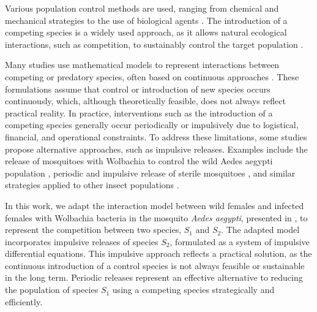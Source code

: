 \documentclass[10pt,letterpaper]{article}
\begin{document}
Various population control methods are used, ranging from chemical \cite{brunner1994integratedChemical1,carson2023overcomingI3,gautam2023pesticideChemical2,lees2023insecticidesI1} and mechanical \cite{adhikari2022insectMechanical1,vincent2009physicalM2} strategies to the use of biological agents \cite{brunner1994integratedChemical1,barbosa2018modellingI2, campo2018optimalW9,onen2023mosquito}. The introduction of a competing species is a widely used approach, as it allows natural ecological interactions, such as competition, to sustainably control the target population \cite{lopes2023exploringW4,almeida2022optimalSterile1,barclay1980sterile7,campo2017optimalW10}.

Many studies use mathematical models to represent interactions between competing or predatory species, often based on continuous approaches \cite{campo2018optimalW9,ogunlade2020modelingC1,silva2020modelingC2,perez2020classC3}. These formulations assume that control or introduction of new species occurs continuously, which, although theoretically feasible, does not always reflect practical reality. In practice, interventions such as the introduction of a competing species generally occur periodically or impulsively due to logistical, financial, and operational constraints. To address these limitations, some studies propose alternative approaches, such as impulsive releases. Examples include the release of mosquitoes with Wolbachia to control the wild Aedes aegypti population \cite{almeida2022vectorImpulsive1,li2024modelingImpulsive3,liu2023analysisImpulsive2,dianavinnarasi2021controllingImpulsive4}, periodic and impulsive release of sterile mosquitoes \cite{huang2021studySterile4,huang2017modellingSterile7,huang2021impulsiveSterile5,li2020impulsiveSterile6}, and similar strategies applied to other insect populations \cite{liu2023analysisImpulsive2,pei2018optimizingPests1,wang2011analysisPests2}.

In this work, we adapt the interaction model between wild females and infected females with Wolbachia bacteria in the mosquito \textit{Aedes aegypti}, presented in \cite{Campo2017}, to represent the competition between two species, $S_1$ and $S_2$. The adapted model incorporates impulsive releases of species $S_2$, formulated as a system of impulsive differential equations. This impulsive approach reflects a practical solution, as the continuous introduction of a control species is not always feasible or sustainable in the long term. Periodic releases represent an effective alternative to reducing the population of species $S_1$ using a competing species strategically and efficiently.
\end{document}

